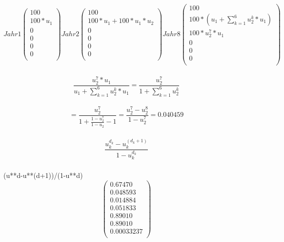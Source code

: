 \documentclass{article}
\begin{document}
\subsubsection{}
\[
Jahr 1
  \begin{pmatrix}
    100 \\
    100 * u_1 \\
    0 \\
    0 \\
    0 \\
    0 \\
  \end{pmatrix}
Jahr 2
  \begin{pmatrix}
    100 \\
    100 * u_1 + 100 * u_1 * u_2\\
    0 \\
    0 \\
    0 \\
    0 \\
  \end{pmatrix}
Jahr 8
  \begin{pmatrix}
    100 \\
    100 * (u_1 + \sum_{k=1}^{6} u_2^k * u_1) \\
    100 * u_2^7 * u_1 \\
    0 \\
    0 \\
    0 \\
  \end{pmatrix}
\]

\subsubsection{}
\Large {
$$\frac{u_2^7 * u_1}{u_1 + \sum_{k=1}^{6} u_2^k * u_1} 
= \frac{u_2^7}{1 + \sum_{k=1}^{6} u_2^k}$$ \\
$$= \frac{u_2^7}{1 + \frac{1 - u_2^7}{1 - u_2}-1} =
 \frac{u_2^7 - u_2^8}{1-u_2^7} = 0.040459$$
}

\subsubsection{}
\Large {
$$\frac{u_k^{d_k} - u_k^{(d_k+1)}}{1-u_k^{d_k}}$$
}

\subsubsection{}
(u**d-u**(d+1))/(1-u**d)
\[
    \begin{pmatrix}
     0.67470 \\
     0.048593 \\
     0.014884  \\
     0.051833 \\
     0.89010 \\
     0.89010 \\
     0.00033237 \\
    \end{pmatrix}
\]
\end{document}
